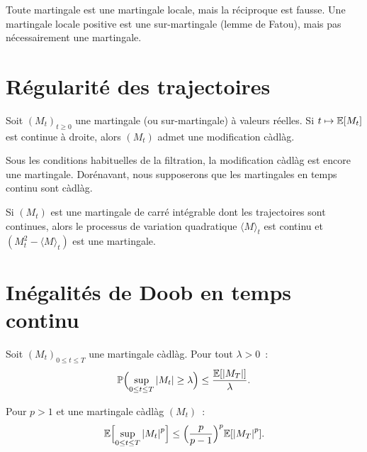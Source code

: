 \begin{attention}[title=\textbf{Martingale locale $\neq$ martingale}]
Toute martingale est une martingale locale, mais la r\'eciproque est fausse.
Une martingale locale positive est une sur-martingale (lemme de Fatou), mais pas
n\'ecessairement une martingale.
\end{attention}

\section{R\'egularit\'e des trajectoires}

\begin{theoreme}
\label{thm:cadlag}
Soit $(M_t)_{t \geq 0}$ une martingale (ou sur-martingale) \`a valeurs r\'eelles.
Si $t \mapsto \mathbb{E}[M_t]$ est continue \`a droite, alors $(M_t)$ admet une
modification c\`adl\`ag.
\end{theoreme}

\begin{remarque}
Sous les conditions habituelles de la filtration, la modification c\`adl\`ag est
encore une martingale. Dor\'enavant, nous supposerons que les martingales en
temps continu sont c\`adl\`ag.
\end{remarque}

\begin{theoreme}
Si $(M_t)$ est une martingale de carr\'e int\'egrable dont les trajectoires sont
continues, alors le processus de variation quadratique $\langle M \rangle_t$ est
continu et $(M_t^2 - \langle M \rangle_t)$ est une martingale.
\end{theoreme}

\section{In\'egalit\'es de Doob en temps continu}

\begin{theoreme}
Soit $(M_t)_{0 \leq t \leq T}$ une martingale c\`adl\`ag. Pour tout $\lambda > 0$~:
\[
  \mathbb{P}\Bigl(\sup_{0 \leq t \leq T} \left| M_t \right| \geq \lambda\Bigr)
  \leq \frac{\mathbb{E}[\left| M_T \right|]}{\lambda}.
\]
\end{theoreme}

\begin{theoreme}
Pour $p > 1$ et une martingale c\`adl\`ag $(M_t)$~:
\[
  \mathbb{E}\Bigl[\sup_{0 \leq t \leq T} \left| M_t \right|^p\Bigr]
  \leq \Bigl(\frac{p}{p-1}\Bigr)^p \mathbb{E}[\left| M_T \right|^p].
\]
\end{theoreme}

